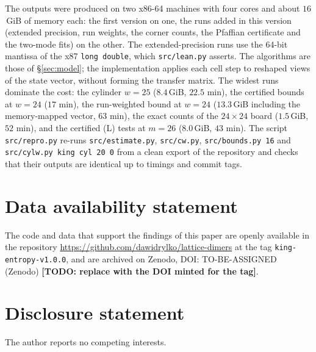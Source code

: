 \documentclass[11pt]{amsart}
\theoremstyle{definition}
\theoremstyle{remark}
\newcommand{\file}[1]{\texttt{#1}}
\newcommand{\TODO}[1]{\textbf{[TODO: #1]}}
\begin{document}
The outputs were produced on two x86-64 machines with four cores and about $16$\,GiB of memory
each: the first version on one, the runs added in this version (extended precision, run weights,
the corner counts, the Pfaffian certificate and the two-mode fits) on the other. The extended-precision
runs use the 64-bit mantissa of the x87 \texttt{long double}, which \file{src/lean.py} asserts. The
algorithms are those of \S\ref{sec:model}; the implementation applies each cell step to reshaped
views of the state vector, without forming the transfer matrix. The widest
runs dominate the cost: the cylinder $w = 25$ ($8.4$\,GiB, $22.5$ min), the certified bounds at
$w = 24$ ($17$ min), the run-weighted bound at $w = 24$ ($13.3$\,GiB including the memory-mapped vector, $63$ min), the exact counts of the
$24 \times 24$ board ($1.5$\,GiB, $52$ min), and the certified (L) tests at $m = 26$ ($8.0$\,GiB, $43$ min). The script
\file{src/repro.py} re-runs \texttt{src/estimate.py}, \texttt{src/cw.py}, \texttt{src/bounds.py 16} and
\texttt{src/cylw.py king cyl 20 0} from a clean export of the repository and
checks that their outputs are identical up to timings and commit tags.

\section*{Data availability statement}
The code and data that support the findings of this paper are openly available in the
repository \url{https://github.com/dawidrylko/lattice-dimers} at the tag
\texttt{king-entropy-v1.0.0}, and are archived on Zenodo,
DOI: TO-BE-ASSIGNED (Zenodo) \TODO{replace with the DOI minted for the tag}.

\section*{Disclosure statement}
The author reports no competing interests.



\end{document}
